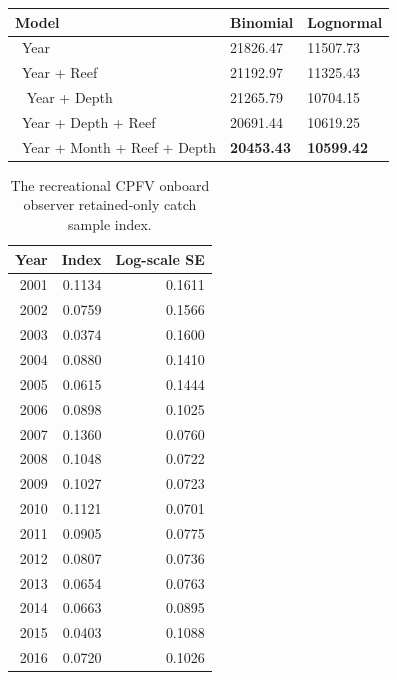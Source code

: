 \documentclass[12pt,]{article}
\begin{document}
\begin{table}[ht]
\begin{tabular}{lll}
  \hline
Model & Binomial & Lognormal \\ 
  \hline
~Year & 21826.47 & 11507.73 \\ 
  ~Year + Reef & 21192.97 & 11325.43 \\ 
  ~ Year + Depth & 21265.79 & 10704.15 \\ 
  ~Year + Depth + Reef & 20691.44 & 10619.25 \\ 
  ~Year + Month + Reef + Depth & \textbf{20453.43} & \textbf{10599.42} \\ 
   \hline
\end{tabular}
\end{table}\vspace{2in}

\begin{table}[ht]
\centering
\caption{The recreational CPFV
                                            onboard observer retained-only
                                            catch sample index.} 
\label{tab:Fleet12_RecPC_onboard_index}
\begin{tabular}{rrr}
  \hline
Year & Index & Log-scale SE \\ 
  \hline
 2001 & 0.1134 & 0.1611 \\ 
   2002 & 0.0759 & 0.1566 \\ 
   2003 & 0.0374 & 0.1600 \\ 
   2004 & 0.0880 & 0.1410 \\ 
   2005 & 0.0615 & 0.1444 \\ 
   2006 & 0.0898 & 0.1025 \\ 
   2007 & 0.1360 & 0.0760 \\ 
   2008 & 0.1048 & 0.0722 \\ 
   2009 & 0.1027 & 0.0723 \\ 
   2010 & 0.1121 & 0.0701 \\ 
   2011 & 0.0905 & 0.0775 \\ 
   2012 & 0.0807 & 0.0736 \\ 
   2013 & 0.0654 & 0.0763 \\ 
   2014 & 0.0663 & 0.0895 \\ 
   2015 & 0.0403 & 0.1088 \\ 
   2016 & 0.0720 & 0.1026 \\ 
   \hline
\end{tabular}
\end{table}

\FloatBarrier

\vspace{2in}
\end{document}
